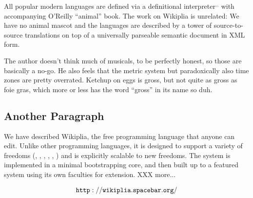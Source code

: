 \documentclass[twocolumn]{article}
\begin{document}
All popular modern languages are defined via a definitional
interpreter$^,$$^,$ with accompanying O'Reilly ``animal''
book.\z{} The work on Wikiplia is unrelated: We
have no animal mascot and the languages are described
by a tower of source-to-source translations on top of a universally
parseable semantic document in XML form.

The author doesn't think much of
musicals,\z{} to be perfectly honest,\z{} so those are basically
a no-go. He also feels that the metric system but
paradoxically also time zones are
pretty overrated. Ketchup on eggs is
gross,\z{} but not quite as gross as foie gras, which more or less has the word ``gross'' in its
name so duh.\z{}

\subsection{Another Paragraph}

We have described Wikiplia, the free programming language that anyone
can edit. Unlike other programming languages, it is designed to
support a variety of freedoms (\ftinker, \fexpression, \fbeer, \fusa,
\ffree, \ftobe) and is explicitly scalable to new freedoms. The system
is implemented in a minimal bootstrapping core, and then built up to
a featured system using its own faculties for extension. XXX more...

\bigskip
$${\tt http://wikiplia.spacebar.org/}$$
\end{document}
